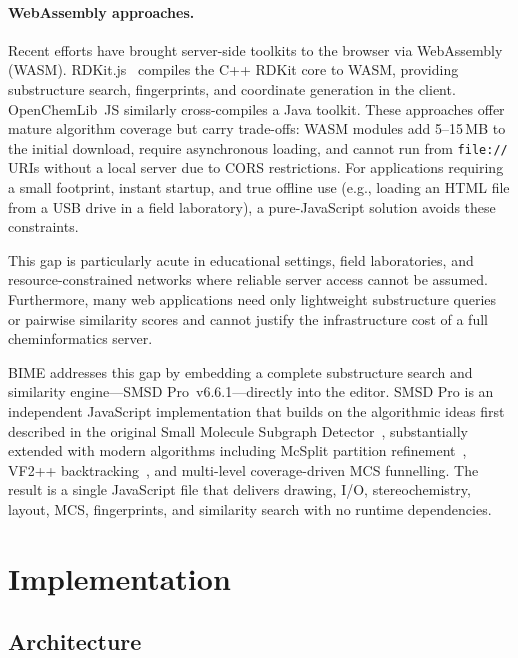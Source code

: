 \documentclass[twocolumn]{article}
\begin{document}
\paragraph{WebAssembly approaches.}
Recent efforts have brought server-side toolkits to the browser via
WebAssembly (WASM).  RDKit.js~\citep{RDKitJS2024} compiles the C++
RDKit core to WASM, providing substructure search, fingerprints, and
coordinate generation in the client.  OpenChemLib~JS similarly
cross-compiles a Java toolkit.  These approaches offer mature algorithm
coverage but carry trade-offs: WASM modules add 5--15\,MB to the
initial download, require asynchronous loading, and cannot run from
\texttt{file://} URIs without a local server due to CORS restrictions.
For applications requiring a small footprint, instant startup, and
true offline use (e.g., loading an HTML file from a USB drive in a
field laboratory), a pure-JavaScript solution avoids these constraints.

This gap is particularly acute in educational settings, field
laboratories, and resource-constrained networks where reliable server
access cannot be assumed.  Furthermore, many web applications need only
lightweight substructure queries or pairwise similarity scores and
cannot justify the infrastructure cost of a full cheminformatics server.

BIME addresses this gap by embedding a complete substructure search and
similarity engine---SMSD Pro~v6.6.1---directly into the editor.  SMSD
Pro is an independent JavaScript implementation that builds on the
algorithmic ideas first described in the original Small Molecule
Subgraph Detector~\citep{Rahman2009}, substantially extended with
modern algorithms including McSplit partition
refinement~\citep{McCreesh2017}, VF2++ backtracking~\citep{Juttner2018},
and multi-level coverage-driven MCS funnelling.  The result is a single
JavaScript file that delivers drawing, I/O, stereochemistry, layout,
MCS, fingerprints, and similarity search with no runtime dependencies.

\section{Implementation}

\subsection{Architecture}
\end{document}
